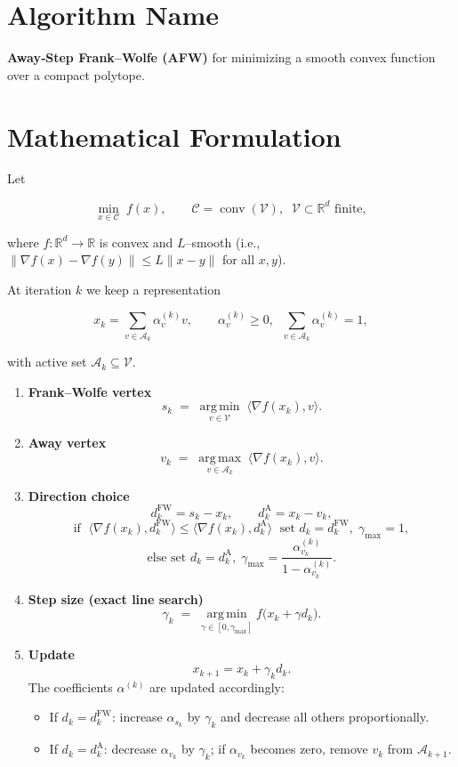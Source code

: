 \documentclass{article}
\newcommand{\argmin}{\operatorname*{arg\,min}}
\newcommand{\argmax}{\operatorname*{arg\,max}}
\newcommand{\conv}{\operatorname{conv}}
\newcommand{\poly}{\mathcal{C}}
\newcommand{\grad}{\nabla}
\newcommand{\R}{\mathbb{R}}
\begin{document}
\section*{Algorithm Name}
\textbf{Away‑Step Frank–Wolfe (AFW)} for minimizing a smooth convex function over a compact polytope.

\section*{Mathematical Formulation}
Let  

\[
\min_{x\in\poly}\; f(x),\qquad 
\poly=\conv(\mathcal{V}),\;\; \mathcal{V}\subset\R^{d}\text{ finite},
\]

where $f:\R^{d}\rightarrow\R$ is convex and $L$–smooth (i.e., 
$\|\grad f(x)-\grad f(y)\| \le L\|x-y\|$ for all $x,y$).  

At iteration $k$ we keep a representation  

\[
x_k=\sum_{v\in\mathcal{A}_k}\alpha_v^{(k)} v,\qquad 
\alpha_v^{(k)}\ge 0,\;\;\sum_{v\in\mathcal{A}_k}\alpha_v^{(k)}=1,
\]

with active set $\mathcal{A}_k\subseteq\mathcal{V}$.

\begin{enumerate}[label=\arabic*)]
\item \textbf{Frank–Wolfe vertex}
\[
s_k \;=\; \argmin_{v\in\mathcal{V}}\;\langle \grad f(x_k),v\rangle .
\]
\item \textbf{Away vertex}
\[
v_k \;=\; \argmax_{v\in\mathcal{A}_k}\;\langle \grad f(x_k),v\rangle .
\]
\item \textbf{Direction choice}
\[
d_k^{\text{FW}} = s_k - x_k,\qquad 
d_k^{\text{A}} = x_k - v_k,
\]
\[
\text{if }\;\langle\grad f(x_k),d_k^{\text{FW}}\rangle
\le \langle\grad f(x_k),d_k^{\text{A}}\rangle
\;\text{ set } d_k=d_k^{\text{FW}},\;\gamma_{\max}=1,
\]
\[
\text{else set } d_k=d_k^{\text{A}},\;
\gamma_{\max}= \frac{\alpha_{v_k}^{(k)}}{1-\alpha_{v_k}^{(k)}} .
\]
\item \textbf{Step size (exact line search)}
\[
\gamma_k \;=\; \argmin_{\gamma\in[0,\gamma_{\max}]}
f\bigl(x_k+\gamma d_k\bigr).
\]
\item \textbf{Update}
\[
x_{k+1}=x_k+\gamma_k d_k.
\]
The coefficients $\alpha^{(k)}$ are updated accordingly:
\begin{itemize}
\item If $d_k=d_k^{\text{FW}}$: increase $\alpha_{s_k}$ by $\gamma_k$ and
decrease all others proportionally.
\item If $d_k=d_k^{\text{A}}$: decrease $\alpha_{v_k}$ by $\gamma_k$;
if $\alpha_{v_k}$ becomes zero, remove $v_k$ from $\mathcal{A}_{k+1}$.
\end{itemize}
\end{enumerate}
\end{document}
